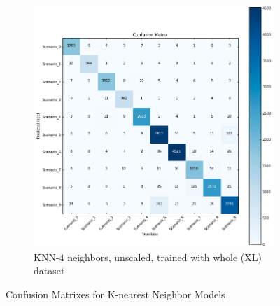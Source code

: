 \begin{figure}[!htb]
\begin{subfigure}[htb]{0.49\textwidth}
        \includegraphics[width=\linewidth]{figures/knn_unscaled_XL_4}
        \caption{KNN-4 neighbors, unscaled, trained with whole (XL) dataset}
        \label{fig:knn_4}
    \end{subfigure}
    \caption{Confusion Matrixes for K-nearest Neighbor Models}
    \label{fig:confusionknn}
\end{figure}

